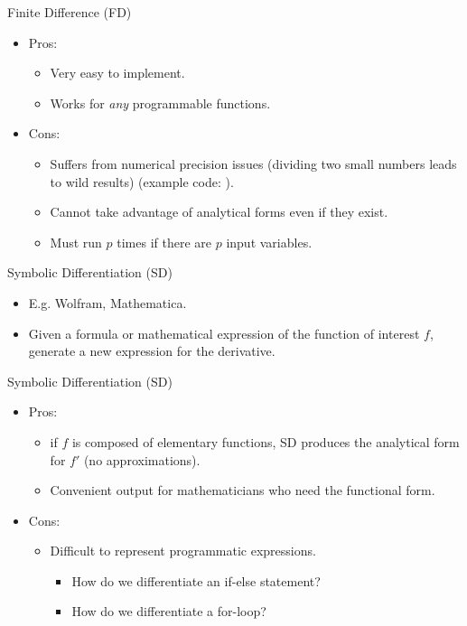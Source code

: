 \begin{frame}{Finite Difference (FD)}
\begin{itemize}
    \item Pros:
    \begin{itemize}
        \item Very easy to implement.
        \item Works for \emph{any} programmable functions.
    \end{itemize}
    \item Cons:
    \begin{itemize}
        \item Suffers from numerical precision issues (dividing two small numbers leads to wild results) (example code: ).
        \item Cannot take advantage of analytical forms even if they exist.
        \item Must run $p$ times if there are $p$ input variables.
    \end{itemize}
\end{itemize}
\end{frame}

\begin{frame}{Symbolic Differentiation (SD)}
\begin{itemize}
    \item E.g. Wolfram, Mathematica.
    \item Given a formula or mathematical expression of the function of interest $f$,
    generate a new expression for the derivative.
\end{itemize}
\end{frame}

\begin{frame}{Symbolic Differentiation (SD)}
\begin{itemize}
    \item Pros:
    \begin{itemize}
        \item if $f$ is composed of elementary functions,
            SD produces the analytical form for $f'$ (no approximations).
        \item Convenient output for mathematicians who need the functional form.
    \end{itemize}
    \item Cons:
    \begin{itemize}
        \item Difficult to represent programmatic expressions.
        \begin{itemize}
            \item How do we differentiate an if-else statement?
            \item How do we differentiate a for-loop?
        \end{itemize}
    \end{itemize}
\end{itemize}
\end{frame}

